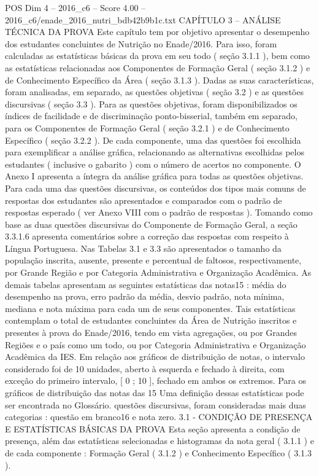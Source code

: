 \begin{textsample}{POS Dim 4 – 2016\_c6 – Score 4.00 – 2016\_c6/enade\_2016\_nutri\_bdb42b9b1c.txt}  \label{ex:f4_pos_056}
CAPÍTULO 3 – ANÁLISE TÉCNICA DA PROVA Este capítulo tem por objetivo apresentar o desempenho dos estudantes concluintes de Nutrição no Enade/2016.
Para isso, foram calculadas as estatísticas básicas da prova em seu todo ( seção 3.1.1 ), bem como as estatísticas relacionadas aos Componentes de Formação Geral ( seção 3.1.2 ) e de Conhecimento Específico da Área ( seção 3.1.3 ).
Dadas as suas características, foram analisadas, em separado, as questões objetivas ( seção 3.2 ) e as questões discursivas ( seção 3.3 ).
Para as questões objetivas, foram disponibilizados os índices de facilidade e de discriminação ponto-bisserial, também em separado, para os Componentes de Formação Geral ( seção 3.2.1 ) e de Conhecimento Específico ( seção 3.2.2 ).
De cada componente, uma das questões foi escolhida para exemplificar a análise gráfica, relacionando as alternativas escolhidas pelos estudantes ( inclusive o gabarito ) com o número de acertos no componente.
O Anexo I apresenta a íntegra da análise gráfica para todas as questões objetivas.
Para cada uma das questões discursivas, os conteúdos dos tipos mais comuns de respostas dos estudantes são apresentados e comparados com o padrão de respostas esperado ( ver Anexo VIII com o padrão de respostas ).
Tomando como base as duas questões discursivas do Componente de Formação Geral, a seção 3.3.1.6 apresenta comentários sobre a correção das respostas com respeito à Língua Portuguesa.
Nas Tabelas 3.1 e 3.3 são apresentados o tamanho da população inscrita, ausente, presente e percentual de faltosos, respectivamente, por Grande Região e por Categoria Administrativa e Organização Acadêmica.
As demais tabelas apresentam as seguintes estatísticas das notas15 : média do desempenho na prova, erro padrão da média, desvio padrão, nota mínima, mediana e nota máxima para cada um de seus componentes.
Tais estatísticas contemplam o total de estudantes concluintes da Área de Nutrição inscritos e presentes à prova do Enade/2016, tendo em vista agregações, ou por Grandes Regiões e o país como um todo, ou por Categoria Administrativa e Organização Acadêmica da IES.
Em relação aos gráficos de distribuição de notas, o intervalo considerado foi de 10 unidades, aberto à esquerda e fechado à direita, com exceção do primeiro intervalo, [ 0 ; 10 ], fechado em ambos os extremos.
Para os gráficos de distribuição das notas das 15 Uma definição dessas estatísticas pode ser encontrada no Glossário. questões discursivas, foram consideradas mais duas categorias : questão em branco16 e nota zero. 3.1 - CONDIÇÃO DE PRESENÇA E ESTATÍSTICAS BÁSICAS DA PROVA Esta seção apresenta a condição de presença, além das estatísticas selecionadas e histogramas da nota geral ( 3.1.1 ) e de cada componente : Formação Geral ( 3.1.2 ) e Conhecimento Específico ( 3.1.3 ).

\end{textsample}
